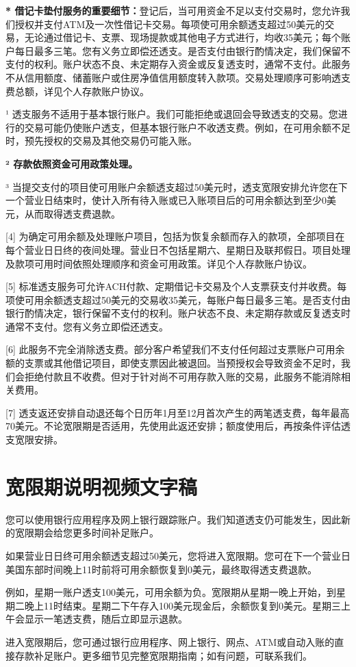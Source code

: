 \documentclass[UTF8,fontset=none,11pt,a4paper]{ctexart}
\begin{document}
\textbf{* 借记卡垫付服务的重要细节：}登记后，当可用资金不足以支付交易时，您允许我们授权并支付ATM及一次性借记卡交易。每项使可用余额透支超过50美元的交易，无论通过借记卡、支票、现场提款或其他电子方式进行，均收35美元；每个账户每日最多三笔。您有义务立即偿还透支。是否支付由银行酌情决定，我们保留不支付的权利。账户状态不良、未定期存入资金或反复透支时，通常不支付。此服务不从信用额度、储蓄账户或住房净值信用额度转入款项。交易处理顺序可影响透支费总额，详见个人存款账户协议。


¹ 透支服务不适用于基本银行账户。我们可能拒绝或退回会导致透支的交易。您进行的交易可能仍使账户透支，但基本银行账户不收透支费。例如，在可用余额不足时，预先授权的交易及其他交易仍可能入账。


\textbf{² 存款依照资金可用政策处理。}


³ 当提交支付的项目使可用账户余额透支超过50美元时，透支宽限安排允许您在下一个营业日结束时，使计入所有待入账或已入账项目后的可用余额达到至少0美元，从而取得透支费退款。


[4] 为确定可用余额及处理账户项目，包括为恢复余额而存入的款项，全部项目在每个营业日日终的夜间处理。营业日不包括星期六、星期日及联邦假日。项目处理及款项可用时间依照处理顺序和资金可用政策。详见个人存款账户协议。


[5] 标准透支服务可允许ACH付款、定期借记卡交易及个人支票获支付并收费。每项使可用余额透支超过50美元的交易收35美元，每账户每日最多三笔。是否支付由银行酌情决定，银行保留不支付的权利。账户状态不良、未定期存款或反复透支时通常不支付。您有义务立即偿还透支。


[6] 此服务不完全消除透支费。部分客户希望我们不支付任何超过支票账户可用余额的支票或其他借记项目，即使支票因此被退回。当预授权会导致资金不足时，我们会拒绝付款且不收费。但对于针对尚不可用存款入账的交易，此服务不能消除相关费用。


[7] 透支返还安排自动退还每个日历年1月至12月首次产生的两笔透支费，每年最高70美元。不论宽限期是否适用，先使用此返还安排；额度使用后，再按条件评估透支宽限安排。


\section*{宽限期说明视频文字稿}
您可以使用银行应用程序及网上银行跟踪账户。我们知道透支仍可能发生，因此新的宽限期会给您更多时间补足账户。


如果营业日日终可用余额透支超过50美元，您将进入宽限期。您可在下一个营业日美国东部时间晚上11时前将可用余额恢复到0美元，最终取得透支费退款。


例如，星期一账户透支100美元，可用余额为负。宽限期从星期一晚上开始，到星期二晚上11时结束。星期二下午存入100美元现金后，余额恢复到0美元。星期三上午会显示一笔透支费，随后立即显示退款。


进入宽限期后，您可通过银行应用程序、网上银行、网点、ATM或自动入账的直接存款补足账户。更多细节见完整宽限期指南；如有问题，可联系我们。
\end{document}
